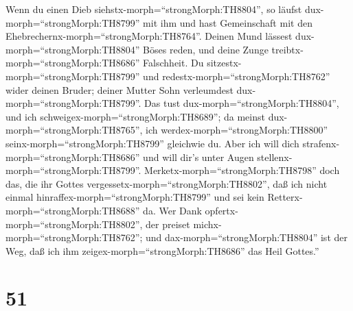  Wenn du einen Dieb siehstx-morph=``strongMorph:TH8804'',
so läufst dux-morph=``strongMorph:TH8799'' mit ihm und hast Gemeinschaft
mit den Ehebrechernx-morph=``strongMorph:TH8764''.  Deinen
Mund lässest dux-morph=``strongMorph:TH8804'' Böses reden, und deine
Zunge treibtx-morph=``strongMorph:TH8686'' Falschheit.  Du
sitzestx-morph=``strongMorph:TH8799'' und
redestx-morph=``strongMorph:TH8762'' wider deinen Bruder; deiner Mutter
Sohn verleumdest dux-morph=``strongMorph:TH8799''.  Das
tust dux-morph=``strongMorph:TH8804'', und ich
schweigex-morph=``strongMorph:TH8689''; da meinst
dux-morph=``strongMorph:TH8765'', ich
werdex-morph=``strongMorph:TH8800'' seinx-morph=``strongMorph:TH8799''
gleichwie du. Aber ich will dich strafenx-morph=``strongMorph:TH8686''
und will dir's unter Augen stellenx-morph=``strongMorph:TH8799''.
 Merketx-morph=``strongMorph:TH8798'' doch das, die ihr
Gottes vergessetx-morph=``strongMorph:TH8802'', daß ich nicht einmal
hinraffex-morph=``strongMorph:TH8799'' und sei kein
Retterx-morph=``strongMorph:TH8688'' da.  Wer Dank
opfertx-morph=``strongMorph:TH8802'', der preiset
michx-morph=``strongMorph:TH8762''; und dax-morph=``strongMorph:TH8804''
ist der Weg, daß ich ihm zeigex-morph=``strongMorph:TH8686'' das Heil
Gottes.''

\hypertarget{section-50}{%
\section{51}\label{section-50}}

